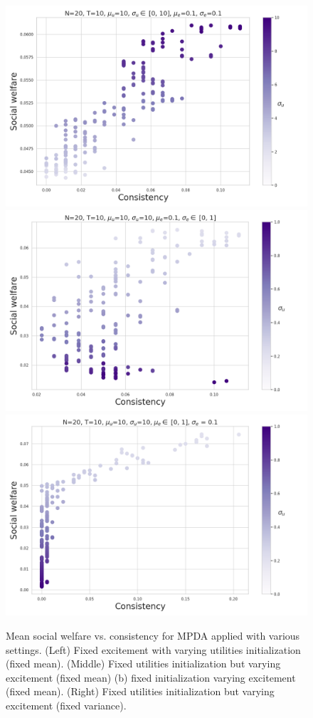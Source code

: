 \begin{figure}
    \centering
    \includegraphics[width=0.32\linewidth]{figures/mpda_dynamics_initliazation.png}
    \includegraphics[width=0.32\linewidth]{figures/mpda_dynamics_excitement_std.png}
    \includegraphics[width=0.32\linewidth]{figures/mpda_dynamics_excitement_mean.png}
     \caption{Mean social welfare vs. consistency for MPDA applied with various settings. (Left) Fixed excitement with varying utilities initialization (fixed mean). (Middle) Fixed utilities initialization but varying excitement (fixed mean) (b) fixed initialization varying excitement (fixed mean). (Right) Fixed utilities initialization but varying excitement (fixed variance).}
    \label{fig:mpda_dynamics}
\end{figure}